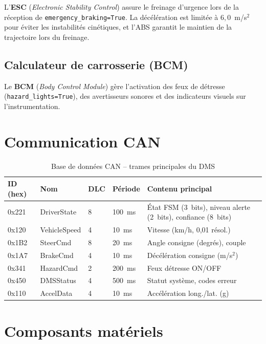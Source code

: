 \documentclass[12pt,a4paper]{report}
\begin{document}
L'\textbf{ESC} (\textit{Electronic Stability Control}) assure le freinage d'urgence lors de la r\'eception de \texttt{emergency\_braking=True}. La d\'ec\'el\'eration est limit\'ee \`a $6{,}0$~m/s$^2$ pour \'eviter les instabilit\'es cin\'etiques, et l'ABS garantit le maintien de la trajectoire lors du freinage.

\subsection{Calculateur de carrosserie (BCM)}

Le \textbf{BCM} (\textit{Body Control Module}) g\`ere l'activation des feux de d\'etresse (\texttt{hazard\_lights=True}), des avertisseurs sonores et des indicateurs visuels sur l'instrumentation.

\section{Communication CAN}

\begin{table}[H]
\centering
\caption{Base de donn\'ees CAN -- trames principales du DMS}
\label{tab:can_db}
\begin{tabular}{C{1.6cm} L{3cm} C{1.2cm} C{1.3cm} L{3.5cm}}
\toprule
\textbf{ID (hex)} & \textbf{Nom} & \textbf{DLC} & \textbf{P\'eriode} & \textbf{Contenu principal} \\
\midrule
0x221 & DriverState & 8 & 100~ms & \'Etat FSM (3~bits), niveau alerte (2~bits), confiance (8~bits) \\
0x120 & VehicleSpeed & 4 & 10~ms & Vitesse (km/h, 0{,}01 r\'esol.) \\
0x1B2 & SteerCmd & 8 & 20~ms & Angle consigne (degr\'es), couple \\
0x1A7 & BrakeCmd & 4 & 10~ms & D\'ec\'el\'eration consigne (m/s$^2$) \\
0x341 & HazardCmd & 2 & 200~ms & Feux d\'etresse ON/OFF \\
0x450 & DMSStatus & 4 & 500~ms & Statut syst\`eme, codes erreur \\
0x110 & AccelData & 4 & 10~ms & Acc\'el\'eration long./lat. (g) \\
\bottomrule
\end{tabular}
\end{table}

\section{Composants mat\'eriels}
\end{document}
